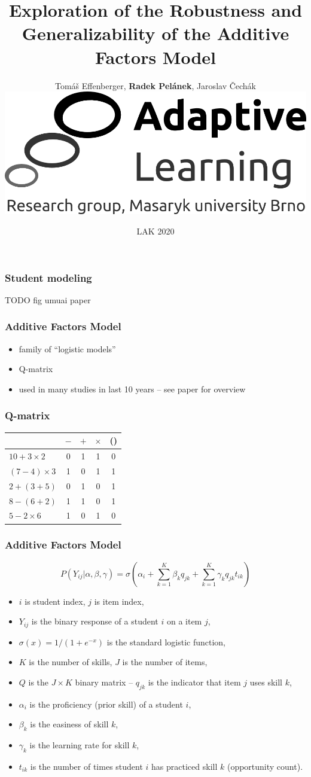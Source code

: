 \documentclass[bigger]{beamer}
\title{Exploration of the Robustness and Generalizability of the Additive Factors Model}
\author{Tom{\'a}{\v{s}} Effenberger, \textbf{Radek Pel\'anek}, Jaroslav \v{C}ech\'ak\\[10mm]
\includegraphics[width=.3\linewidth]{al-logo}
}
\date{LAK 2020}
\begin{document}
\frame{\titlepage}

\begin{frame}
  \frametitle{Student modeling}

  TODO fig umuai paper
\end{frame}

\begin{frame}
  \frametitle{Additive Factors Model}

  \begin{itemize}
  \item family of ``logistic models''
  \item Q-matrix
  \item used in many studies in last 10 years -- see paper for overview
  \end{itemize}
\end{frame}

\begin{frame}
  \frametitle{Q-matrix}

  \begin{center}
      \begin{tabular}{lcccc}
    \toprule
    & $-$ & $+$ & $\times$ & () \\
    \midrule
    $10+3\times 2$ & 0 & 1 &  1 & 0 \\
    $(7-4)\times 3$ & 1 & 0 & 1 & 1 \\
    $2+ (3 + 5)$ & 0 & 1 & 0 & 1 \\
    $8-(6+2)$ & 1 & 1 & 0 & 1 \\
    $5-2\times 6$ & 1 & 0 &  1 & 0 \\
    \bottomrule
  \end{tabular}
  \end{center}
\end{frame}


\begin{frame}
  \frametitle{Additive Factors Model}

  \[ P(Y_{ij}|\alpha, \beta, \gamma) = \sigma\left(\alpha_i + \sum_{k=1}^K
    \beta_k q_{jk} + \sum_{k=1}^K \gamma_k q_{jk} t_{ik}\right) \]

\begin{itemize}
\item $i$ is student index, $j$ is item index,
\item $Y_{ij}$ is the binary response of a student $i$ on a item $j$,
\item $\sigma(x) = 1 / (1 + e^{-x})$ is the standard logistic function,
\item $K$ is the number of skills, $J$ is the number of items,
\item $Q$ is the $J\times K$ binary matrix -- $q_{jk}$ is the indicator that
  item $j$ uses skill $k$,
\item $\alpha_i$ is the proficiency (prior skill) of a student $i$,
\item $\beta_k$ is the easiness of skill $k$,
\item $\gamma_k$ is the learning rate for skill $k$,
\item $t_{ik}$ is the number of times student $i$ has practiced skill $k$
  (opportunity count).
\end{itemize}
\end{frame}
\end{document}
